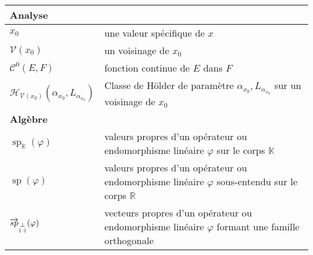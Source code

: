 \begin{tabularx}{\textwidth}{lX}
	\midrule
	\textbf{Analyse}                                                 &                                                                                                                                                                                                            \\
	\midrule
	$x_0$                                                            & une valeur spécifique de $x$                                                                                                                                                                               \\
	$\mathcal{V}(x_0)$                                               & un voisinage de $x_0$                                                                                                                                                                                      \\
	$\mathcal C^0(E, F)$                                             & fonction continue de $E$ dans $F$                                                                                                                                                                          \\
	$\mathcal{H}_{\mathcal{V}(x_0)}(\alpha_{x_0}, L_{\alpha_{x_0}})$ & Classe de Hölder de paramètre $\alpha_{x_0}, L_{\alpha_{x_0}}$ sur un voisinage de $x_0$                                                                                                                   \\
	\midrule
	\textbf{Algèbre}                                                 &                                                                                                                                                                                                            \\
	\midrule
	$\operatorname{sp}_{\mathds K}(\varphi)$                         & valeurs propres d'un opérateur ou endomorphisme linéaire $\varphi$ sur le corps $\mathds K$                                                                                                                \\
	$\operatorname{sp}(\varphi)$                                     & valeurs propres d'un opérateur ou endomorphisme linéaire $\varphi$ sous-entendu sur le corps $\mathds R$                                                                                                   \\
	$\overrightarrow{sp}_{\underset{\Vert \cdot \Vert}{\perp}}(\varphi)$                    & vecteurs propres d'un opérateur ou endomorphisme linéaire $\varphi$ formant une famille orthogonale                                                                                                        \\

\end{tabularx}
